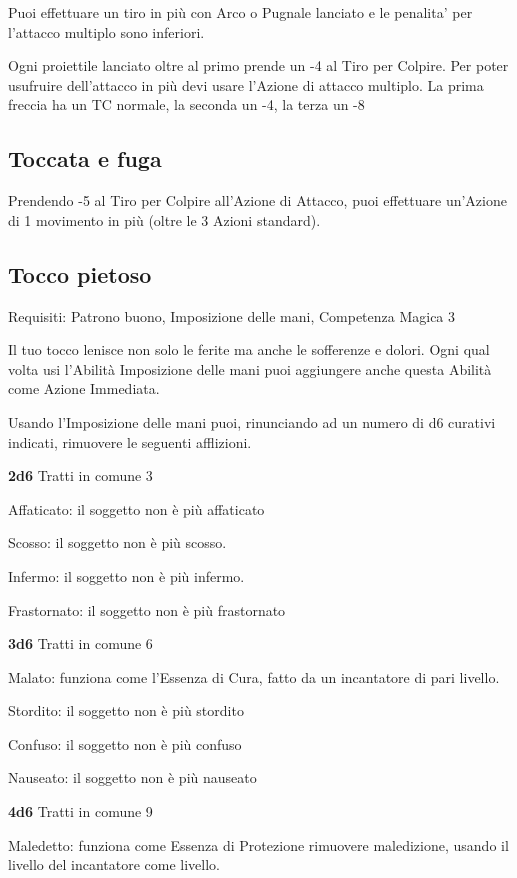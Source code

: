 \documentclass[a4paper,11pt,twoside,openany]{book}
\begin{document}
Puoi effettuare un tiro in più con Arco o Pugnale lanciato e le penalita' per l'attacco multiplo sono inferiori.

Ogni proiettile lanciato oltre al primo prende un -4 al Tiro per Colpire. Per poter usufruire dell'attacco in più devi usare l'Azione di attacco multiplo.
La prima freccia ha un TC normale, la seconda un -4, la terza un -8

\subsection{Toccata e fuga}

Prendendo -5 al Tiro per Colpire all'Azione di Attacco, puoi effettuare un'Azione di 1 movimento in più (oltre le 3 Azioni standard).

\subsection{Tocco pietoso}

Requisiti: Patrono buono, Imposizione delle mani, Competenza Magica 3

Il tuo tocco lenisce non solo le ferite ma anche le sofferenze e dolori. Ogni qual volta usi l'Abilità Imposizione delle mani puoi aggiungere anche questa Abilità come Azione Immediata.

Usando l'Imposizione delle mani puoi, rinunciando ad un numero di d6 curativi indicati, rimuovere le seguenti afflizioni.

\textbf{2d6} Tratti in comune 3

Affaticato: il soggetto non è più affaticato

Scosso: il soggetto non è più scosso.

Infermo: il soggetto non è più infermo.

Frastornato: il soggetto non è più frastornato

\textbf{3d6} Tratti in comune 6

Malato: funziona come l'Essenza di Cura, fatto da un incantatore di pari livello.

Stordito: il soggetto non è più stordito

Confuso: il soggetto non è più confuso

Nauseato: il soggetto non è più nauseato

\textbf{4d6} Tratti in comune 9

Maledetto: funziona come Essenza di Protezione rimuovere maledizione, usando il livello del incantatore come livello.
\end{document}
